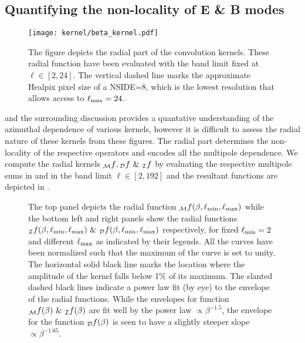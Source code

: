 \subsection{Quantifying the non-locality of E \& B modes} \label{sec:radial_locality}
%
\begin{figure}[t]
\centering
\texttt{[image: kernel/beta\_kernel.pdf]}
\caption{The figure depicts the radial part of the convolution kernels. These radial function have been evaluated with the band limit fixed at $\ell \in [2,24]$. The vertical dashed line marks the approximate Healpix pixel size of a NSIDE=8, which is the lowest resolution that allows access to $\ell_{\rm max}=24$.}
\label{fig:beta_kernel}
\end{figure}
%
 and the surrounding discussion provides a quantative understanding of the  azimuthal dependence of various kernels, however it is difficult to assess the radial nature of these kernels from these figures. The radial part determines the non-locality of the respective operators and encodes all the multipole dependence. We compute the radial kernels ${_{\mathcal{M}}f}, {_{\mathcal{D}}f} ~\&~ {_{\mathcal{I}}f} $ by evaluating the respective multipole sums in  and  in the band limit $\ell \in [2,192]$ and the resultant functions are depicted in . 
%
\begin{figure}[t]
\centering
{}
\caption{The top panel depicts the radial function  ${_{\mathcal{M}}f}(\beta,\ell_{\rm min},\ell_{\rm max})$ while the bottom left and right panels show the radial functions ${}_{\mathcal{I}}f(\beta,\ell_{\rm min},\ell_{\rm max}) ~\&~ {}_{\mathcal{D}}f(\beta,\ell_{\rm min},\ell_{\rm max})$ respectively, for fixed $\ell_{\rm min}=2$ and different $\ell_{\rm max}$ as indicated by their legends. All the curves have been normalized such that the maximum of the curve is set to unity. The horizontal solid black line marks the location where the amplitude of the kernel falls below 1\% of its maximum. The slanted dashed black lines indicate a power law fit (by eye) to the envelope of the radial functions. While the envelopes for function ${_{\mathcal{M}}f}(\beta)~\&~ {}_{\mathcal{I}}f(\beta)$ are fit well by the power law $\propto \beta^{-1.5}$, the envelope for the function ${}_{\mathcal{D}}f(\beta)$ is seen to have a slightly steeper slope $\propto \beta^{-1.65}$.}
\label{fig:rad_ker_decay}
\end{figure}
